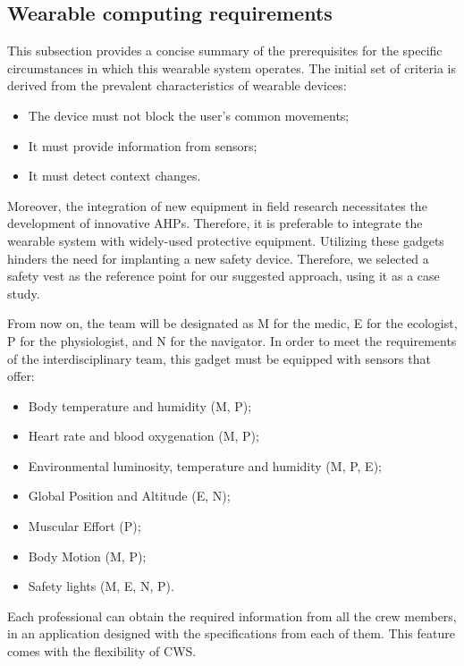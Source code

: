 \subsection{Wearable computing requirements}

This subsection provides a concise summary of the prerequisites for the specific circumstances in which this wearable system operates. The initial set of criteria is derived from the prevalent characteristics of wearable devices:

\begin{itemize}
    \item The device must not block the user's common movements;
    \item It must provide information from sensors;
    \item It must detect context changes.
\end{itemize}

Moreover, the integration of new equipment in field research necessitates the development of innovative AHPs. Therefore, it is preferable to integrate the wearable system with widely-used protective equipment. Utilizing these gadgets hinders the need for implanting a new safety device. Therefore, we selected a safety vest as the reference point for our suggested approach, using it as a case study.

From now on, the team will be designated as M for the medic, E for the ecologist, P for the physiologist, and N for the navigator. In order to meet the requirements of the interdisciplinary team, this gadget must be equipped with sensors that offer:

\begin{itemize}
    \item Body temperature and humidity (M, P);
    \item Heart rate and blood oxygenation (M, P);
    \item Environmental luminosity, temperature and humidity (M, P, E);
    \item Global Position and Altitude (E, N);
    \item Muscular Effort (P);
    \item Body Motion (M, P);
    \item Safety lights (M, E, N, P).
\end{itemize}

Each professional can obtain the required information from all the crew members, in an application designed with the specifications from each of them. This feature comes with the flexibility of CWS.

